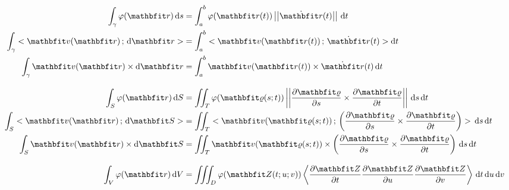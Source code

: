 \documentclass[lang=magyar]{math-handout}
\begin{document}
\vfill

\begin{block}
  \vspace*{-2em}
  \begin{align*}
    \int_\gamma \varphi(\rvec r) \, \diff s
     & =
    \int_a^b \varphi(\rvec r(t)) \norma{\dot{\rvec r}(t)} \, \diff t
    \\
    \int_\gamma \scalar{\rvec v(\rvec r)}{\diff \rvec r}
     & =
    \int_a^b \scalar{\rvec v(\rvec r(t))}{\dot{\rvec r}(t)} \diff t
    \\
    \int_\gamma \rvec v(\rvec r) \times \diff \rvec r
     & =
    \int_a^b \rvec v(\rvec r(t)) \times \dot{\rvec r}(t) \, \diff t
    \\[3mm]
    \int_S \varphi (\rvec r) \, \diff S
     & =
    \iint_T \varphi (\rvec \varrho(s; t))
    \norma{\pdv{\rvec \varrho}{s} \times \pdv{\rvec \varrho}{t}}
    \, \diff s \, \diff t
    \\
    \int_S \scalar{\rvec v (\rvec r)}{\diff \rvec S}
     & =
    \iint_T \scalar
    {\rvec v (\rvec \varrho(s; t))}
    {\left(\pdv{\rvec \varrho}{s} \times \pdv{\rvec \varrho}{t}\right)}
    \, \diff s \, \diff t
    \\
    \int_S \rvec v (\rvec r) \times \diff \rvec S
     & =
    \iint_T {\rvec v (\rvec \varrho(s; t))} \times
    \left(\pdv{\rvec \varrho}{s} \times \pdv{\rvec \varrho}{t}\right)
    \, \diff s \, \diff t
    \\[3mm]
    \int_V \varphi (\rvec r) \, \diff V
     & =
    \iiint_D \varphi (\rvec Z(t; u; v))
    \left\langle\pdv{\rvec Z}{t}\pdv{\rvec Z}{u}\pdv{\rvec Z}{v}\right\rangle
    \, \diff t \, \diff u \, \diff v
  \end{align*}
\end{block}

\clearpage
\newcommand{\bitem}[1]{\bullet\; \textbf{{#1}}}
\end{document}
